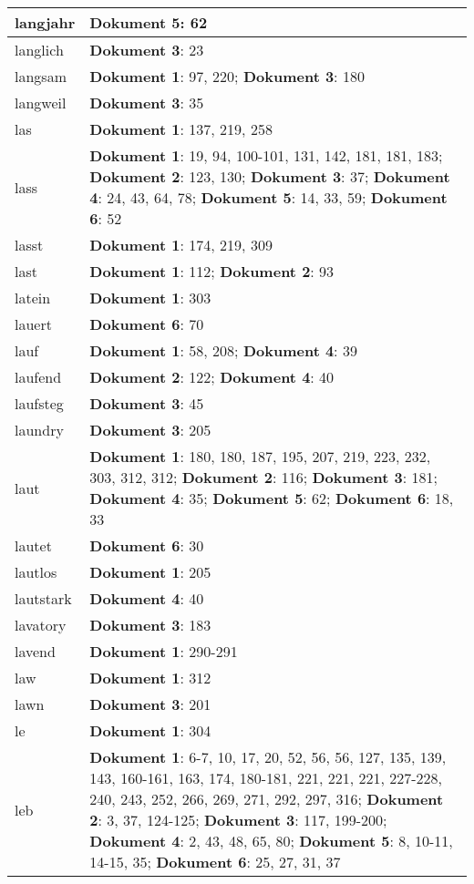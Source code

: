 \documentclass[a5paper]{article}
\begin{document}
\begin{longtable}[l]{|l|p{3in}|}
\hline
langjahr & \textbf{Dokument 5}: 62 \\
\hline
langlich & \textbf{Dokument 3}: 23 \\
\hline
langsam & \textbf{Dokument 1}: 97, 220; \textbf{Dokument 3}: 180 \\
\hline
langweil & \textbf{Dokument 3}: 35 \\
\hline
las & \textbf{Dokument 1}: 137, 219, 258 \\
\hline
lass & \textbf{Dokument 1}: 19, 94, 100-101, 131, 142, 181, 181, 183; \textbf{Dokument 2}: 123, 130; \textbf{Dokument 3}: 37; \textbf{Dokument 4}: 24, 43, 64, 78; \textbf{Dokument 5}: 14, 33, 59; \textbf{Dokument 6}: 52 \\
\hline
lasst & \textbf{Dokument 1}: 174, 219, 309 \\
\hline
last & \textbf{Dokument 1}: 112; \textbf{Dokument 2}: 93 \\
\hline
latein & \textbf{Dokument 1}: 303 \\
\hline
lauert & \textbf{Dokument 6}: 70 \\
\hline
lauf & \textbf{Dokument 1}: 58, 208; \textbf{Dokument 4}: 39 \\
\hline
laufend & \textbf{Dokument 2}: 122; \textbf{Dokument 4}: 40 \\
\hline
laufsteg & \textbf{Dokument 3}: 45 \\
\hline
laundry & \textbf{Dokument 3}: 205 \\
\hline
laut & \textbf{Dokument 1}: 180, 180, 187, 195, 207, 219, 223, 232, 303, 312, 312; \textbf{Dokument 2}: 116; \textbf{Dokument 3}: 181; \textbf{Dokument 4}: 35; \textbf{Dokument 5}: 62; \textbf{Dokument 6}: 18, 33 \\
\hline
lautet & \textbf{Dokument 6}: 30 \\
\hline
lautlos & \textbf{Dokument 1}: 205 \\
\hline
lautstark & \textbf{Dokument 4}: 40 \\
\hline
lavatory & \textbf{Dokument 3}: 183 \\
\hline
lavend & \textbf{Dokument 1}: 290-291 \\
\hline
law & \textbf{Dokument 1}: 312 \\
\hline
lawn & \textbf{Dokument 3}: 201 \\
\hline
le & \textbf{Dokument 1}: 304 \\
\hline
leb & \textbf{Dokument 1}: 6-7, 10, 17, 20, 52, 56, 56, 127, 135, 139, 143, 160-161, 163, 174, 180-181, 221, 221, 221, 227-228, 240, 243, 252, 266, 269, 271, 292, 297, 316; \textbf{Dokument 2}: 3, 37, 124-125; \textbf{Dokument 3}: 117, 199-200; \textbf{Dokument 4}: 2, 43, 48, 65, 80; \textbf{Dokument 5}: 8, 10-11, 14-15, 35; \textbf{Dokument 6}: 25, 27, 31, 37 \\

\end{longtable}
\end{document}
